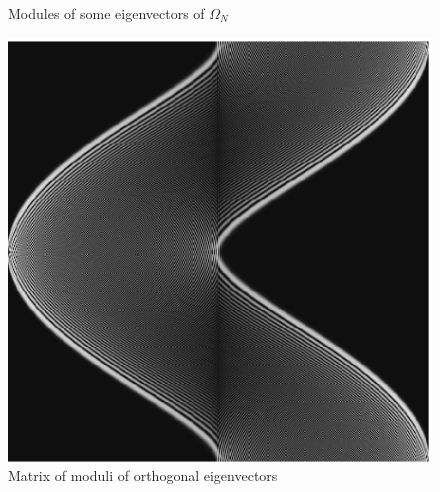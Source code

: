 \begin{exo}
\begin{figure}[ht]
\begin{center}
    \end{center}
    \caption{Modules of some eigenvectors of $ \Omega_N $}
              \label{fig-eigenvectors-tfd}
\end{figure}
\begin{figure}[ht] 
    \begin{center}
    \includegraphics[scale=0.5]{images/matrice-vecteurs-propres-tfd.eps}
    \end{center}
    \caption{Matrix of moduli of orthogonal eigenvectors}
              \label{fig-matrix-eigenvectors-tfd}
\end{figure}
\end{exo}
 
